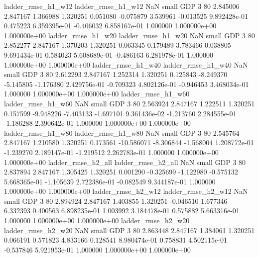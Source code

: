       ladder_rmse_h1_w12       ladder_rmse_h1_w12                   NaN      small      GDP                 3 80 2.845006       2.847167 1.366988       1.320251    0.051080     -0.075879      3.539961    -0.013525   9.892428e-01  0.475223 6.359395e-01    -0.406032   6.858167e-01            1.000000    1.000000e+00        1.000000e+00
      ladder_rmse_h1_w20       ladder_rmse_h1_w20                   NaN      small      GDP                 3 80 2.852277       2.847167 1.370203       1.320251    0.063345      0.179489      3.783466     0.038805   9.691434e-01  0.584023 5.608689e-01    -0.486163   6.281978e-01            1.000000    1.000000e+00        1.000000e+00
      ladder_rmse_h1_w40       ladder_rmse_h1_w40                   NaN      small      GDP                 3 80 2.612293       2.847167 1.252314       1.320251    0.125843     -8.249370     -5.145805    -1.176380   2.429756e-01 -0.709323 4.802126e-01    -0.946453   3.468034e-01            1.000000    1.000000e+00        1.000000e+00
      ladder_rmse_h1_w60       ladder_rmse_h1_w60                   NaN      small      GDP                 3 80 2.563924       2.847167 1.222511       1.320251    0.157599     -9.948226     -7.403133    -1.697101   9.361436e-02 -1.213760 2.284555e-01    -1.186288   2.390642e-01            1.000000    1.000000e+00        1.000000e+00
      ladder_rmse_h1_w80       ladder_rmse_h1_w80                   NaN      small      GDP                 3 80 2.545764       2.847167 1.210580       1.320251    0.173561    -10.586071     -8.306844    -1.568004   1.208772e-01 -1.239270 2.189147e-01    -1.219512   2.262783e-01            1.000000    1.000000e+00        1.000000e+00
      ladder_rmse_h2_all       ladder_rmse_h2_all                   NaN      small      GDP                 3 80 2.837894       2.847167 1.305425       1.320251    0.001290     -0.325699     -1.122980    -0.575132   5.668365e-01 -1.105639 2.722386e-01    -0.082549   9.344187e-01            1.000000    1.000000e+00        1.000000e+00
      ladder_rmse_h2_w12       ladder_rmse_h2_w12                   NaN      small      GDP                 3 80 2.894924       2.847167 1.403855       1.320251   -0.046510      1.677346      6.332393     0.400563   6.898235e-01  1.003992 3.184478e-01     0.575882   5.663316e-01            1.000000    1.000000e+00        1.000000e+00
      ladder_rmse_h2_w20       ladder_rmse_h2_w20                   NaN      small      GDP                 3 80 2.863448       2.847167 1.384061       1.320251    0.066191      0.571823      4.833166     0.128541   8.980474e-01  0.758831 4.502115e-01    -0.537846   5.921953e-01            1.000000    1.000000e+00        1.000000e+00
